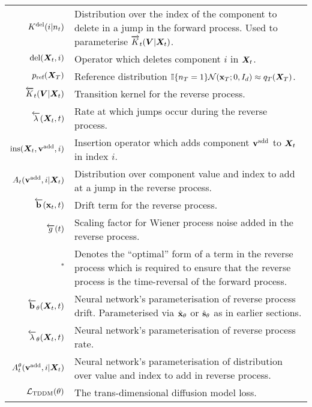 \begin{table*}
\begin{tabular}{rp{9cm}}
    $K^{\textup{del}}(i | n_t)$                 & Distribution over the index of the component to delete in a jump in the forward process. Used to parameterise $\overrightarrow{K}_t({\bm{V}}|{\bm{X}}_t)$. \\
    $\text{del}({\bm{X}}_t, i)$                 & Operator which deletes component $i$ in ${\bm{X}}_t$. \\
    $p_{\textup{ref}}({\bm{X}}_T)$                 & Reference distribution $\mathbb{I} \{ n_T = 1\} \mathcal{N}({\mathbf{x}}_T; 0, I_{d}) \approx q_T({\bm{X}}_T)$. \\
    $\overleftarrow{K}_t( {\bm{V}} |{\bm{X}}_t)$                    & Transition kernel for the reverse process. \\
    $\overleftarrow{\lambda}({\bm{X}}_t, t)$                & Rate at which jumps occur during the reverse process. \\
    $\text{ins}({\bm{X}}_t, {\mathbf{v}}^{\textup{add}}, i)$                             & Insertion operator which adds component ${\mathbf{v}}^{\textup{add}}$ to ${\bm{X}}_t$ in index $i$.   \\
    $A_t({\mathbf{v}}^{\textup{add}}, i | {\bm{X}}_t)$           & Distribution over component value and index to add at a jump in the reverse process.    \\
    $\overleftarrow{\mathbf{b}}({\mathbf{x}}_t, t)$              & Drift term for the reverse process. \\
    $\overleftarrow{g}(t)$                  & Scaling factor for Wiener process noise added in the reverse process. \\
    $^*$             & Denotes the ``optimal'' form of a term in the reverse process which is required to ensure that the reverse process is the time-reversal of the forward process. \\
    $\overleftarrow{\mathbf{b}}_\theta({\bm{X}}_t, t)$ & Neural network's parameterisation of reverse process drift. Parameterised via $\hat{{\mathbf{x}}}_\theta$ or $\hat{{\mathbf{s}}}_\theta$ as in earlier sections. \\
    $\overleftarrow{\lambda}_\theta({\bm{X}}_t, t) $ & Neural network's parameterisation of reverse process rate. \\
    $A_t^\theta({\mathbf{v}}^{\textup{add}}, i | {\bm{X}}_t)$ & Neural network's parameterisation of distribution over value and index to add in reverse process. \\
    ${\mathcal{L}}_\text{TDDM}(\theta)$                      & The trans-dimensional diffusion model loss. \\
    \bottomrule
  \end{tabular}
\end{table*}


